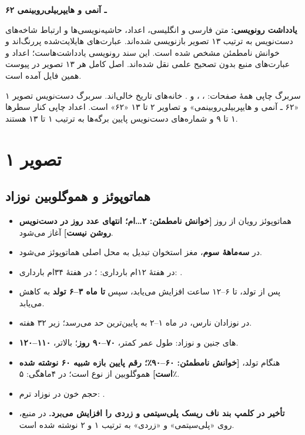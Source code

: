 \documentclass[12pt,a4paper]{article}
\begin{document}
\fi
\providecommand{\AHmark}[1]{\textbf{#1}}
\providecommand{\AHunclear}[1]{\textbf{[خوانش نامطمئن: #1]}}
\providecommand{\AHmath}[1]{\lr{\(#1\)}}
\providecommand{\AHpage}[1]{\clearpage\section*{تصویر #1}}

\begin{center}
{\Large\bfseries ۶۲ ـ آنمی و هایپربیلی‌روبینمی}\par
{}
\end{center}
\textbf{یادداشت رونویسی:}
متن فارسی و انگلیسی، اعداد، حاشیه‌نویسی‌ها و ارتباط شاخه‌های دست‌نویس به ترتیب
۱۳ تصویر بازنویسی شده‌اند. عبارت‌های هایلایت‌شده پررنگ‌اند و خوانش نامطمئن مشخص شده است.
این سند رونویسی یادداشت‌هاست؛ اعداد و عبارت‌های منبع بدون تصحیح علمی نقل شده‌اند.
اصل کامل هر ۱۳ تصویر در پیوست همین فایل آمده است.

سربرگ چاپی همهٔ صفحات: ، ،  و .
خانه‌های تاریخ خالی‌اند. سربرگ دست‌نویس تصویر ۱ «۶۲ ـ آنمی و هایپربیلی‌روبینمی»
و تصاویر ۲ تا ۱۳ «۶۲» است. اعداد چاپی کنار سطرها ۱ تا ۹ و شماره‌های دست‌نویس
پایین برگه‌ها به ترتیب ۱ تا ۱۳ هستند.

\AHpage{۱}
\subsection*{هماتوپوئز و هموگلوبین نوزاد}
\begin{itemize}
\item هماتوپوئز رویان از روز \AHunclear{۲…ام؛ انتهای عدد روز در دست‌نویس روشن نیست} آغاز می‌شود.
\item در \AHmark{سه‌ماههٔ سوم}، مغز استخوان تبدیل به محل اصلی هماتوپوئز می‌شود.
\item {} در هفتهٔ ۱۲ام بارداری: ؛
در هفتهٔ ۳۴ام بارداری: \AHmark{}.
\item پس از تولد،  تا ۶–۱۲ ساعت افزایش می‌یابد، سپس
\AHmark{تا ماه ۳–۶ تولد} به \AHmark{} کاهش می‌یابد.
\item در نوزادان نارس، در ماه ۱–۲ به پایین‌ترین حد می‌رسد؛ زیر ۳۲ هفته.
\item {}های جنین و نوزاد: طول عمر کمتر، \AHmark{۷۰–۹۰ روز}؛
 بالاتر، \AHmark{۱۱۰–۱۲۰}.
\item هنگام تولد، \AHunclear{۶۰–۹۰٪؛ رقم پایین بازه شبیه ۶۰ نوشته شده است}
هموگلوبین از نوع  است؛ در ۴ماهگی: ۵٪.
\item حجم خون در نوزاد ترم: .
\item \AHmark{تأخیر در کلمپ بند ناف ریسک پلی‌سیتمی و زردی را افزایش می‌برد.}
در منبع، روی «پلی‌سیتمی» و «زردی» به ترتیب ۱ و ۲ نوشته شده است.
\end{itemize}
\end{document}
